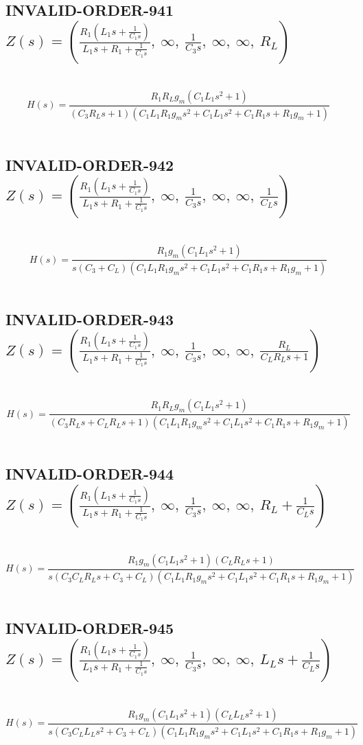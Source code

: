 \documentclass{article}
\begin{document}
\subsection{INVALID-ORDER-941 $Z(s) = \left( \frac{R_{1} \left(L_{1} s + \frac{1}{C_{1} s}\right)}{L_{1} s + R_{1} + \frac{1}{C_{1} s}}, \  \infty, \  \frac{1}{C_{3} s}, \  \infty, \  \infty, \  R_{L}\right)$ } \ 
\textbf{\[H(s) = \frac{R_{1} R_{L} g_{m} \left(C_{1} L_{1} s^{2} + 1\right)}{\left(C_{3} R_{L} s + 1\right) \left(C_{1} L_{1} R_{1} g_{m} s^{2} + C_{1} L_{1} s^{2} + C_{1} R_{1} s + R_{1} g_{m} + 1\right)}\] } \ 
\subsection{INVALID-ORDER-942 $Z(s) = \left( \frac{R_{1} \left(L_{1} s + \frac{1}{C_{1} s}\right)}{L_{1} s + R_{1} + \frac{1}{C_{1} s}}, \  \infty, \  \frac{1}{C_{3} s}, \  \infty, \  \infty, \  \frac{1}{C_{L} s}\right)$ } \ 
\textbf{\[H(s) = \frac{R_{1} g_{m} \left(C_{1} L_{1} s^{2} + 1\right)}{s \left(C_{3} + C_{L}\right) \left(C_{1} L_{1} R_{1} g_{m} s^{2} + C_{1} L_{1} s^{2} + C_{1} R_{1} s + R_{1} g_{m} + 1\right)}\] } \ 
\subsection{INVALID-ORDER-943 $Z(s) = \left( \frac{R_{1} \left(L_{1} s + \frac{1}{C_{1} s}\right)}{L_{1} s + R_{1} + \frac{1}{C_{1} s}}, \  \infty, \  \frac{1}{C_{3} s}, \  \infty, \  \infty, \  \frac{R_{L}}{C_{L} R_{L} s + 1}\right)$ } \ 
\textbf{\[H(s) = \frac{R_{1} R_{L} g_{m} \left(C_{1} L_{1} s^{2} + 1\right)}{\left(C_{3} R_{L} s + C_{L} R_{L} s + 1\right) \left(C_{1} L_{1} R_{1} g_{m} s^{2} + C_{1} L_{1} s^{2} + C_{1} R_{1} s + R_{1} g_{m} + 1\right)}\] } \ 
\subsection{INVALID-ORDER-944 $Z(s) = \left( \frac{R_{1} \left(L_{1} s + \frac{1}{C_{1} s}\right)}{L_{1} s + R_{1} + \frac{1}{C_{1} s}}, \  \infty, \  \frac{1}{C_{3} s}, \  \infty, \  \infty, \  R_{L} + \frac{1}{C_{L} s}\right)$ } \ 
\textbf{\[H(s) = \frac{R_{1} g_{m} \left(C_{1} L_{1} s^{2} + 1\right) \left(C_{L} R_{L} s + 1\right)}{s \left(C_{3} C_{L} R_{L} s + C_{3} + C_{L}\right) \left(C_{1} L_{1} R_{1} g_{m} s^{2} + C_{1} L_{1} s^{2} + C_{1} R_{1} s + R_{1} g_{m} + 1\right)}\] } \ 
\subsection{INVALID-ORDER-945 $Z(s) = \left( \frac{R_{1} \left(L_{1} s + \frac{1}{C_{1} s}\right)}{L_{1} s + R_{1} + \frac{1}{C_{1} s}}, \  \infty, \  \frac{1}{C_{3} s}, \  \infty, \  \infty, \  L_{L} s + \frac{1}{C_{L} s}\right)$ } \ 
\textbf{\[H(s) = \frac{R_{1} g_{m} \left(C_{1} L_{1} s^{2} + 1\right) \left(C_{L} L_{L} s^{2} + 1\right)}{s \left(C_{3} C_{L} L_{L} s^{2} + C_{3} + C_{L}\right) \left(C_{1} L_{1} R_{1} g_{m} s^{2} + C_{1} L_{1} s^{2} + C_{1} R_{1} s + R_{1} g_{m} + 1\right)}\] } \ 
\end{document}
